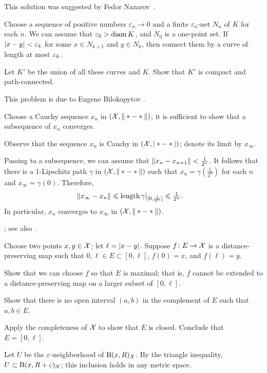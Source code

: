 This solution was suggested by Fedor Nazarov~\cite{nazarov}.

Choose a sequence of positive numbers $\varepsilon_n\to 0$ and a finite $\varepsilon_n$-net $N_n$ of $K$ for each $n$.
We can assume that $\varepsilon_0>\operatorname{\rm diam}\nolimits K$, and $N_0$ is a one-point set.
If $\dist{x}{y}{}<\eps_k$ for some $x\in N_{k+1}$ and $y\in N_{k}$, then connect them by a curve of length at most $\varepsilon_k$.

Let $K'$ be the union of all these curves and $K$.
Show that $K'$ is compact and path-connected.

 This problem is due to Eugene Bilokopytov \cite{bilokopytov}.

Choose a Cauchy sequence $x_n$ in $(\spc{X},\|*\z-*\|)$; it is sufficient to show that a subsequence of $x_n$ converges.

Observe that the sequence $x_n$ is Cauchy in $(\mathcal{X},|*-*|)$;
denote its limit by $x_\infty$.

Passing to a subsequence, we can assume that $\|x_n-x_{n+1}\|\z<\tfrac1{2^n}$.
It follows that there is a 1-Lipschitz path $\gamma$ in $(\mathcal{X},\|*-*\|)$ such that $x_n=\gamma(\tfrac1{2^n})$ for each $n$ and $x_\infty=\gamma(0)$.
Therefore,
\begin{align*}
\|x_\infty-x_n\|&\leqslant \mathop{\rm length}\nolimits\gamma|_{[0,\frac1{2^n}]}\leqslant \tfrac1{2^n}.
\end{align*}
In particular, $x_n$ converges to $x_\infty$ in $(\spc{X},\|*\z-*\|)$.

 \cite[Corollary]{hu-kirk}; see also \cite[Lemma 2.3]{petrunin-stadler}.

 Choose two points $x,y\in \mathcal{X}$;
let $\ell\z=\dist{x}{y}{}$.
Suppose $f\colon E\to \mathcal{X}$ is a distance-preserving map such that $0,\ell\in E\subset [0,\ell]$,
$f(0)=x$, and  $f(\ell)=y$.

Show that we can choose $f$ so that $E$ is maximal;
that is, $f$ cannot be extended to a distance-preserving map on a larger subset of $[0,\ell]$.

Show that there is no open interval $(a,b)$ in the complement of $E$ such that $a,b\in E$.

Apply the completeness of $\mathcal{X}$ to show that $E$ is closed.
Conclude that $E=[0,\ell]$.

Let $U$ be the $\varepsilon$-neighborhood of $\mathrm{B}{}(x,R)_{\mathcal{X}}$.
By the triangle inequality, $U\z\subset \oBall(x,R+\eps)_{\spc{X}}$;
this inclusion holds in any metric space.

